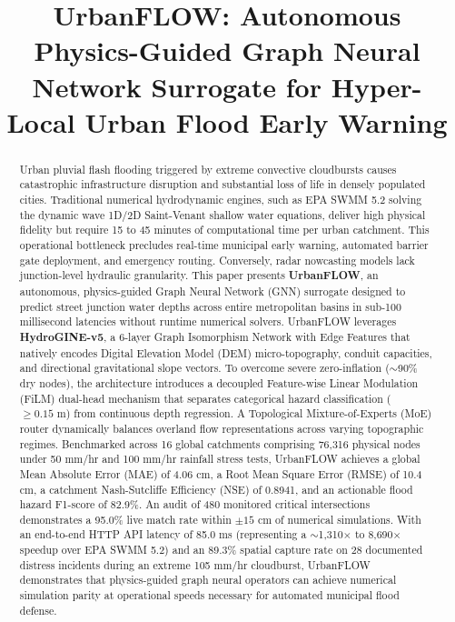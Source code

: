\documentclass[conference]{IEEEtran}
\begin{document}
\title{UrbanFLOW: Autonomous Physics-Guided Graph Neural Network Surrogate for Hyper-Local Urban Flood Early Warning}

\author{
}

\maketitle

\begin{abstract}
Urban pluvial flash flooding triggered by extreme convective cloudbursts causes catastrophic infrastructure disruption and substantial loss of life in densely populated cities. Traditional numerical hydrodynamic engines, such as EPA SWMM 5.2 solving the dynamic wave 1D/2D Saint-Venant shallow water equations, deliver high physical fidelity but require 15 to 45 minutes of computational time per urban catchment. This operational bottleneck precludes real-time municipal early warning, automated barrier gate deployment, and emergency routing. Conversely, radar nowcasting models lack junction-level hydraulic granularity. This paper presents \textbf{UrbanFLOW}, an autonomous, physics-guided Graph Neural Network (GNN) surrogate designed to predict street junction water depths across entire metropolitan basins in sub-100 millisecond latencies without runtime numerical solvers. UrbanFLOW leverages \textbf{HydroGINE-v5}, a 6-layer Graph Isomorphism Network with Edge Features that natively encodes Digital Elevation Model (DEM) micro-topography, conduit capacities, and directional gravitational slope vectors. To overcome severe zero-inflation ($\sim$90\% dry nodes), the architecture introduces a decoupled Feature-wise Linear Modulation (FiLM) dual-head mechanism that separates categorical hazard classification ($\ge 0.15\text{ m}$) from continuous depth regression. A Topological Mixture-of-Experts (MoE) router dynamically balances overland flow representations across varying topographic regimes. Benchmarked across 16 global catchments comprising 76,316 physical nodes under 50 mm/hr and 100 mm/hr rainfall stress tests, UrbanFLOW achieves a global Mean Absolute Error (MAE) of 4.06 cm, a Root Mean Square Error (RMSE) of 10.4 cm, a catchment Nash-Sutcliffe Efficiency (NSE) of 0.8941, and an actionable flood hazard F1-score of 82.9\%. An audit of 480 monitored critical intersections demonstrates a 95.0\% live match rate within $\pm 15\text{ cm}$ of numerical simulations. With an end-to-end HTTP API latency of 85.0 ms (representing a $\sim$1,310$\times$ to 8,690$\times$ speedup over EPA SWMM 5.2) and an 89.3\% spatial capture rate on 28 documented distress incidents during an extreme 105 mm/hr cloudburst, UrbanFLOW demonstrates that physics-guided graph neural operators can achieve numerical simulation parity at operational speeds necessary for automated municipal flood defense.

\end{abstract}
\end{document}
